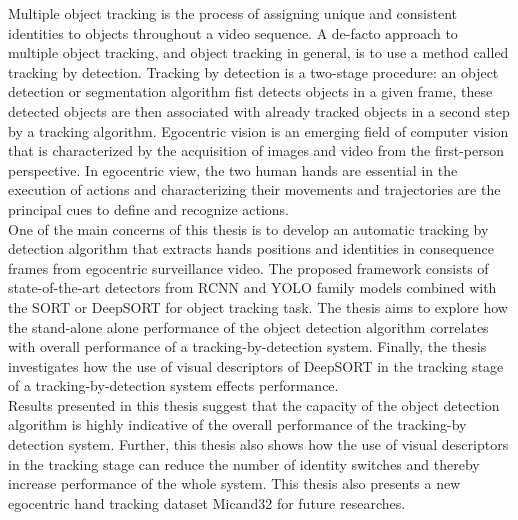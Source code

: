 % 
% 
%
Multiple object tracking is the process of assigning unique and consistent identities to objects throughout a video sequence. A de-facto approach to multiple object tracking, and object tracking in general, is to use a method called tracking by detection. Tracking by detection is a two-stage procedure: an object detection or segmentation algorithm fist detects objects in a given frame, these detected objects are then associated with already tracked objects in a second step by a tracking algorithm. Egocentric vision is an emerging field of computer vision that is characterized by the acquisition of images and video from the first-person perspective. In egocentric view, the two human hands are essential in the execution of actions and characterizing their movements and trajectories are the principal cues to define and recognize actions.
\\One of the main concerns of this thesis is to develop an automatic tracking by detection algorithm that extracts hands positions and identities in consequence frames from egocentric surveillance video. The proposed framework consists of state-of-the-art detectors from RCNN and YOLO family models combined with the SORT or DeepSORT for object tracking task. The thesis aims to explore how the stand-alone alone performance of the object detection algorithm correlates with overall performance of a tracking-by-detection system. Finally, the thesis investigates how the use of visual descriptors of DeepSORT in the tracking stage of a tracking-by-detection system effects performance.
\\Results presented in this thesis suggest that the capacity of the object detection algorithm is highly indicative of the overall performance of the tracking-by detection system. Further, this thesis also shows how the use of visual descriptors in the tracking stage can reduce the number of identity switches and thereby increase performance of the whole system. This thesis also presents a new egocentric hand tracking dataset Micand32 for future researches.

